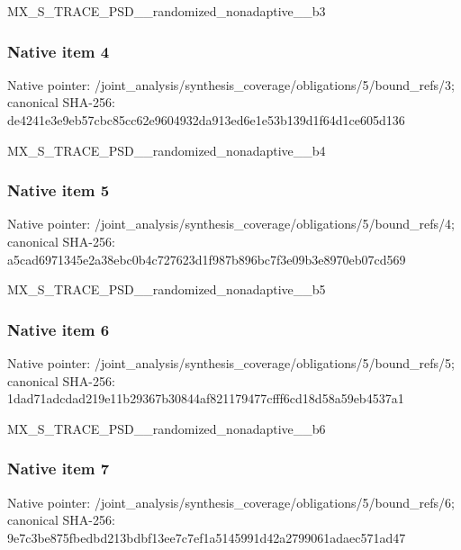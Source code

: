 \documentclass[10pt,a4paper]{article}
\begin{document}
\begingroup\raggedright\sloppy MX\_\allowbreak{}S\_\allowbreak{}TRACE\_\allowbreak{}PSD\_\allowbreak{}\_\allowbreak{}randomized\_\allowbreak{}nonadaptive\_\allowbreak{}\_\allowbreak{}b3\par\endgroup

\subsubsection{Native item 4}
Native pointer: /joint\_\allowbreak{}analysis/synthesis\_\allowbreak{}coverage/obligations/5/bound\_\allowbreak{}refs/3; canonical SHA-256: de4241e3e9eb57cbc85cc62e9604932da913ed6e1e53b139d1f64d1ce605d136

\begingroup\raggedright\sloppy MX\_\allowbreak{}S\_\allowbreak{}TRACE\_\allowbreak{}PSD\_\allowbreak{}\_\allowbreak{}randomized\_\allowbreak{}nonadaptive\_\allowbreak{}\_\allowbreak{}b4\par\endgroup

\subsubsection{Native item 5}
Native pointer: /joint\_\allowbreak{}analysis/synthesis\_\allowbreak{}coverage/obligations/5/bound\_\allowbreak{}refs/4; canonical SHA-256: a5cad6971345e2a38ebc0b4c727623d1f987b896bc7f3e09b3e8970eb07cd569

\begingroup\raggedright\sloppy MX\_\allowbreak{}S\_\allowbreak{}TRACE\_\allowbreak{}PSD\_\allowbreak{}\_\allowbreak{}randomized\_\allowbreak{}nonadaptive\_\allowbreak{}\_\allowbreak{}b5\par\endgroup

\subsubsection{Native item 6}
Native pointer: /joint\_\allowbreak{}analysis/synthesis\_\allowbreak{}coverage/obligations/5/bound\_\allowbreak{}refs/5; canonical SHA-256: 1dad71adcdad219e11b29367b30844af821179477cfff6cd18d58a59eb4537a1

\begingroup\raggedright\sloppy MX\_\allowbreak{}S\_\allowbreak{}TRACE\_\allowbreak{}PSD\_\allowbreak{}\_\allowbreak{}randomized\_\allowbreak{}nonadaptive\_\allowbreak{}\_\allowbreak{}b6\par\endgroup

\subsubsection{Native item 7}
Native pointer: /joint\_\allowbreak{}analysis/synthesis\_\allowbreak{}coverage/obligations/5/bound\_\allowbreak{}refs/6; canonical SHA-256: 9e7c3be875fbedbd213bdbf13ee7c7ef1a5145991d42a2799061adaec571ad47
\end{document}
